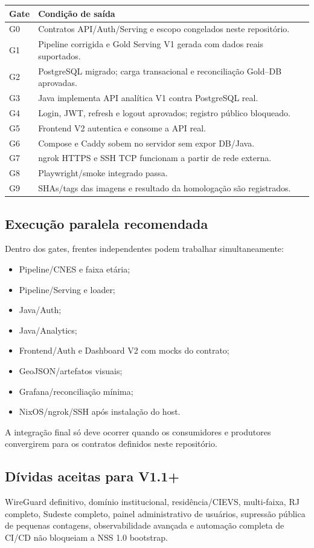\begin{tabularx}{\textwidth}{@{}p{2cm}X@{}}
\toprule
\textbf{Gate} & \textbf{Condição de saída} \\
\midrule
G0 & Contratos API/Auth/Serving e escopo congelados neste repositório. \\
G1 & Pipeline corrigida e Gold Serving V1 gerada com dados reais suportados. \\
G2 & PostgreSQL migrado; carga transacional e reconciliação Gold--DB aprovadas. \\
G3 & Java implementa API analítica V1 contra PostgreSQL real. \\
G4 & Login, JWT, refresh e logout aprovados; registro público bloqueado. \\
G5 & Frontend V2 autentica e consome a API real. \\
G6 & Compose e Caddy sobem no servidor sem expor DB/Java. \\
G7 & ngrok HTTPS e SSH TCP funcionam a partir de rede externa. \\
G8 & Playwright/smoke integrado passa. \\
G9 & SHAs/tags das imagens e resultado da homologação são registrados. \\
\bottomrule
\end{tabularx}

\subsection{Execução paralela recomendada}

Dentro dos gates, frentes independentes podem trabalhar simultaneamente:

\begin{itemize}
    \item Pipeline/CNES e faixa etária;
    \item Pipeline/Serving e loader;
    \item Java/Auth;
    \item Java/Analytics;
    \item Frontend/Auth e Dashboard V2 com mocks do contrato;
    \item GeoJSON/artefatos visuais;
    \item Grafana/reconciliação mínima;
    \item NixOS/ngrok/SSH após instalação do host.
\end{itemize}

A integração final só deve ocorrer quando os consumidores e produtores convergirem para os contratos definidos neste repositório.

\subsection{Dívidas aceitas para V1.1+}

WireGuard definitivo, domínio institucional, residência/CIEVS, multi-faixa, RJ completo, Sudeste completo, painel administrativo de usuários, supressão pública de pequenas contagens, observabilidade avançada e automação completa de CI/CD não bloqueiam a NSS 1.0 bootstrap.
